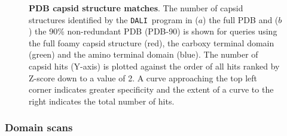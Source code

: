 \documentclass[12pt]{article}
\newcommand{\3}{$3_{10}$}
\newcommand{\DALI}{{\tt DALI}}
\begin{document}
\begin{figure}
\centering
{}
\begin{footnotesize}
\caption{
\label{Fig:rocs}
{\bf PDB capsid structure matches}.
The number of capsid structures identified by the \DALI\ program in ($a$) the full PDB and ($b$)
the 90\% non-redundant PDB (PDB-90) is shown for queries using the full foamy capsid
structure (red), the carboxy terminal domain (green) and the amino terminal domain (blue). 
The number of capsid hits (Y-axis) is plotted against the order of all hits ranked by Z-score
down to a value of 2.   A curve approaching the top left corner indicates greater specificity 
and the extent of a curve to the right indicates the total number of hits.
}
\end{footnotesize}
\end{figure}

\subsubsection{Domain scans}
\end{document}
